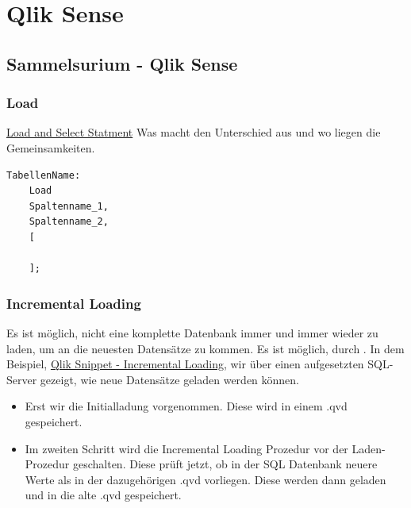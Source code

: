 \pagebreak
\chapter{Qlik Sense}
\setcounter{section}{0}

\section{Sammelsurium - Qlik Sense}
\subsection{Load} 
\href{https://help.qlik.com/en-US/sense/April2020/Subsystems/Hub/Content/Sense_Hub/LoadData/understand-data-structures.htm}{Load and Select Statment} Was macht den Unterschied aus und wo liegen die Gemeinsamkeiten. 
\begin{lstlisting}[style=Qlik]
	TabellenName:
	Load
	Spaltenname_1,
	Spaltenname_2,
	[
	
	];
\end{lstlisting} 

\subsection{Incremental Loading}
Es ist möglich, nicht eine komplette Datenbank immer und immer wieder zu laden, um an die neuesten Datensätze zu kommen. Es ist möglich, durch . In dem Beispiel, \href{https://youtu.be/wJ0XMmK_5Z4}{Qlik Snippet - Incremental Loading}, wir über einen aufgesetzten SQL-Server gezeigt, wie neue Datensätze geladen werden können.
\begin{itemize}
	\item Erst wir die Initialladung vorgenommen. Diese wird in einem \gls{.qvd} gespeichert.
	\item Im zweiten Schritt wird die Incremental Loading Prozedur vor der Laden-Prozedur geschalten. Diese prüft jetzt, ob in der \gls{SQL} Datenbank neuere Werte als in der dazugehörigen \gls{.qvd} vorliegen. Diese werden dann geladen und in die alte \gls{.qvd} gespeichert.
\end{itemize}


